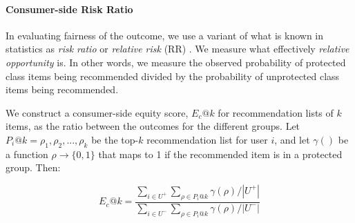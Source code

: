         
        

        
        
        \vspace{0.25cm}
        \noindent \paragraph{Consumer-side Risk Ratio}
        \vspace{0.25cm}
        
            In evaluating fairness of the outcome, we use a variant of what is known in statistics as \textit{risk ratio} or \textit{relative risk} (RR) \cite{romei2014multidisciplinary}. We measure what effectively \textit{relative opportunity} is. In other words, we measure the observed probability of protected class items being recommended divided by the probability of unprotected class items being recommended.
        
            We construct a consumer-side equity score, $E_c@k$ for recommendation lists of $k$ items, as the ratio between the outcomes for the different groups. Let $P_i@k = {\rho_1, \rho_2, ..., \rho_k}$ be the top-$k$ recommendation list for user $i$, and let $\gamma()$ be a function $\rho \rightarrow \{0,1\}$ that maps to 1 if the recommended item is in a protected group. Then:

            \begin{equation}
            E_c@k=\frac{\sum_{i \in U^+}{\sum_{\rho \in P_i@k}{\gamma(\rho)}}/|U^+|}
            {\sum_{i \in U^-}{\sum_{\rho \in P_i@k}{\gamma(\rho)}}/|U^-|}
            \end{equation}
            \vspace{0.25cm}
        
